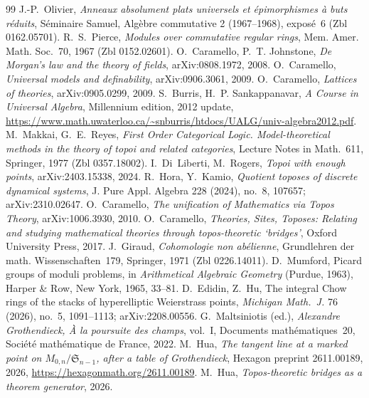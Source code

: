 \begin{thebibliography}{99}
 J.-P.~Olivier, \emph{Anneaux absolument plats universels et épimorphismes à buts réduits}, Séminaire Samuel, Algèbre commutative 2 (1967--1968), exposé~6 (Zbl 0162.05701).
 R.~S.~Pierce, \emph{Modules over commutative regular rings}, Mem. Amer. Math. Soc.~70, 1967 (Zbl 0152.02601).
 O.~Caramello, P.~T. Johnstone, \emph{De Morgan's law and the theory of fields}, arXiv:0808.1972, 2008.
 O.~Caramello, \emph{Universal models and definability}, arXiv:0906.3061, 2009.
 O.~Caramello, \emph{Lattices of theories}, arXiv:0905.0299, 2009.
 S.~Burris, H.~P. Sankappanavar, \emph{A Course in Universal Algebra}, Millennium edition, 2012 update, \url{https://www.math.uwaterloo.ca/~snburris/htdocs/UALG/univ-algebra2012.pdf}.
 M.~Makkai, G.~E.~Reyes, \emph{First Order Categorical Logic. Model-theoretical methods in the theory of topoi and related categories}, Lecture Notes in Math.~611, Springer, 1977 (Zbl 0357.18002).
 I.~Di~Liberti, M.~Rogers, \emph{Topoi with enough points}, arXiv:2403.15338, 2024.
 R.~Hora, Y.~Kamio, \emph{Quotient toposes of discrete dynamical systems}, J. Pure Appl. Algebra 228 (2024), no.~8, 107657; arXiv:2310.02647.
 O.~Caramello, \emph{The unification of Mathematics via Topos Theory}, arXiv:1006.3930, 2010.
 O.~Caramello, \emph{Theories, Sites, Toposes: Relating and studying mathematical theories through topos-theoretic `bridges'}, Oxford University Press, 2017.
 J.~Giraud, \emph{Cohomologie non abélienne}, Grundlehren der math. Wissenschaften~179, Springer, 1971 (Zbl 0226.14011).
 D.~Mumford, Picard groups of moduli problems, in \emph{Arithmetical Algebraic Geometry} (Purdue, 1963), Harper \& Row, New York, 1965, 33--81.
 D.~Edidin, Z.~Hu, The integral Chow rings of the stacks of hyperelliptic Weierstrass points, \emph{Michigan Math.\ J.} 76 (2026), no.~5, 1091--1113; arXiv:2208.00556.
 G.~Maltsiniotis (ed.), \emph{Alexandre Grothendieck, À la poursuite des champs}, vol.~I, Documents mathématiques~20, Société mathématique de France, 2022.
 M.~Hua, \emph{The tangent line at a marked point on $M_{0,n}/\mathfrak S_{n-1}$, after a table of Grothendieck}, Hexagon preprint 2611.00189, 2026, \url{https://hexagonmath.org/2611.00189}.
 M.~Hua, \emph{Topos-theoretic bridges as a theorem generator}, 2026.

\end{thebibliography}
